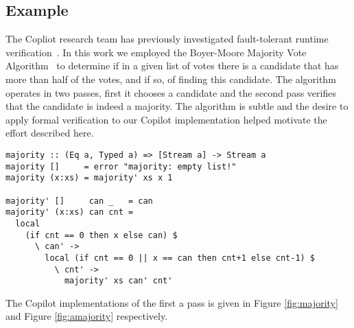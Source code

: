 \subsection{Example}\label{sec:example}
The Copliot research team has previously investigated fault-tolerant
runtime verification~\cite{pike-isse-13}. In this work we employed the Boyer-Moore
Majority Vote Algorithm~\cite{MooreBoyer82,Hesselink2005} to determine
if in a given list of votes there is a candidate that has more than
half of the votes, and if so, of finding this candidate. The algorithm
operates in two passes, first it chooses a candidate and the second
pass verifies that the candidate is indeed a majority.  The algorithm
is subtle and the desire to apply formal verification to our Copilot
implementation helped motivate the effort described here. 


\begin{figure*}[ht]
\begin{lstlisting}[frame=single]
majority :: (Eq a, Typed a) => [Stream a] -> Stream a
majority []     = error "majority: empty list!"
majority (x:xs) = majority' xs x 1

majority' []     can _   = can
majority' (x:xs) can cnt =
  local
    (if cnt == 0 then x else can) $
      \ can' ->
        local (if cnt == 0 || x == can then cnt+1 else cnt-1) $
          \ cnt' ->
            majority' xs can' cnt'
\end{lstlisting}
\caption{The first pass of the majority vote algorithm in Copilot.}
\label{fig:majority}
\end{figure*}

%

The Copilot implementations of the first a
pass is  given in Figure \ref{fig:majority} and Figure \ref{fig:amajority}
respectively. 
